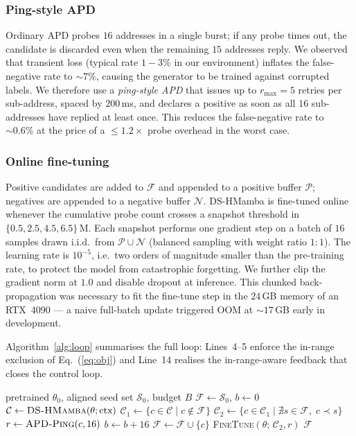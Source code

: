 \documentclass[conference]{IEEEtran}
\begin{document}
\subsubsection{Ping-style APD}
Ordinary APD probes $16$ addresses in a single burst; if any
probe times out, the candidate is discarded even when the
remaining $15$ addresses reply.  We observed that transient
loss (typical rate $1\!-\!3\%$ in our environment) inflates the
false-negative rate to $\sim\!7\%$, causing the generator to be
trained against corrupted labels.  We therefore use a
\emph{ping-style APD} that issues up to $r_{\max}{=}5$ retries
per sub-address, spaced by $200$\,ms, and declares a positive
as soon as all $16$ sub-addresses have replied at least once.
This reduces the false-negative rate to $\sim\!0.6\%$ at the
price of a $\leq\!1.2\times$ probe overhead in the worst case.

\subsubsection{Online fine-tuning}
Positive candidates are added to $\mathcal{F}$ and appended to
a positive buffer $\mathcal{P}$; negatives are appended to a
negative buffer $\mathcal{N}$.  DS-HMamba is fine-tuned online
whenever the cumulative probe count crosses a snapshot
threshold in $\{0.5,2.5,4.5,6.5\}$\,M.  Each snapshot performs
one gradient step on a batch of $16$ samples drawn i.i.d.\
from $\mathcal{P}\!\cup\!\mathcal{N}$ (balanced sampling with
weight ratio $1{:}1$).  The learning rate is $10^{-5}$, i.e.\
two orders of magnitude smaller than the pre-training rate, to
protect the model from catastrophic forgetting.  We further
clip the gradient norm at $1.0$ and disable dropout at
inference.  This chunked back-propagation was necessary to fit
the fine-tune step in the $24$\,GB memory of an RTX~4090 --- a
naive full-batch update triggered OOM at $\sim\!17$\,GB early
in development.

Algorithm~\ref{alg:loop} summarises the full loop: Lines~4--5
enforce the in-range exclusion of Eq.~(\ref{eq:obj}) and
Line~14 realises the in-range-aware feedback that closes the
control loop.

\begin{algorithm}[t]
\caption{Online FRP discovery with in-range-aware feedback}
\label{alg:loop}
\begin{algorithmic}[1]
\Require pretrained $\theta_0$, aligned seed set $\mathcal{S}_{0}$, budget $B$
\State $\mathcal{F}\gets\mathcal{S}_{0}$, \; $b\gets 0$
\While{$b < B$}
   \State $\mathcal{C}\gets\textsc{DS-HMamba}(\theta;\text{ctx})$
   \State $\mathcal{C}_1\gets\{c\in\mathcal{C} \mid c\notin\mathcal{F}\}$
       \Comment{L1 filter}
   \State $\mathcal{C}_2\gets\{c\in\mathcal{C}_1 \mid
       \nexists s\in\mathcal{F},\;c\prec s\}$
       \Comment{L2 filter}
   \ForAll{$c\in\mathcal{C}_2$}
        \State $r\gets\textsc{APD-Ping}(c,16)$
        \State $b\gets b+16$
        \If{$r=\text{FRP}$}
            \State $\mathcal{F}\gets\mathcal{F}\cup\{c\}$
        \EndIf
   \EndFor
   \State \textsc{FineTune}$(\theta;\,\mathcal{C}_2, r)$
\EndWhile
\State \Return $\mathcal{F}$
\end{algorithmic}
\end{algorithm}
\end{document}
